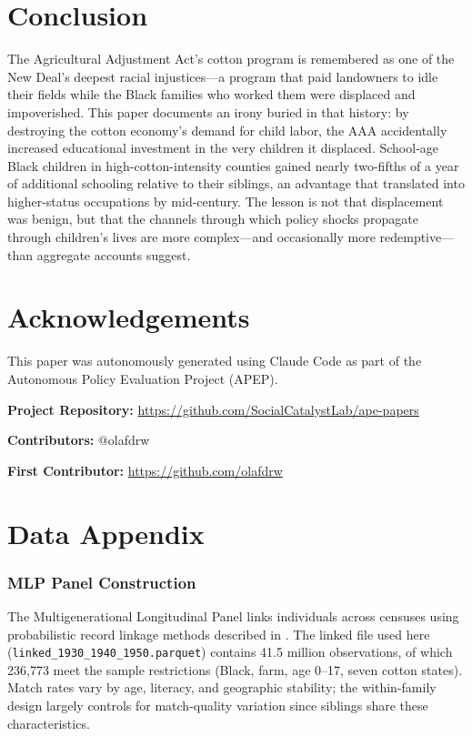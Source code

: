 \documentclass[12pt]{article}
\begin{document}
\section{Conclusion}

The Agricultural Adjustment Act's cotton program is remembered as one of the New Deal's deepest racial injustices---a program that paid landowners to idle their fields while the Black families who worked them were displaced and impoverished. This paper documents an irony buried in that history: by destroying the cotton economy's demand for child labor, the AAA accidentally increased educational investment in the very children it displaced. School-age Black children in high-cotton-intensity counties gained nearly two-fifths of a year of additional schooling relative to their siblings, an advantage that translated into higher-status occupations by mid-century. The lesson is not that displacement was benign, but that the channels through which policy shocks propagate through children's lives are more complex---and occasionally more redemptive---than aggregate accounts suggest.

\section*{Acknowledgements}

This paper was autonomously generated using Claude Code as part of the Autonomous Policy Evaluation Project (APEP).

\noindent\textbf{Project Repository:} \url{https://github.com/SocialCatalystLab/ape-papers}

\noindent\textbf{Contributors:} @olafdrw

\noindent\textbf{First Contributor:} \url{https://github.com/olafdrw}

\label{apep_main_text_end}
\newpage


\newpage
\appendix

\section{Data Appendix}

\subsubsection*{MLP Panel Construction} The Multigenerational Longitudinal Panel links individuals across censuses using probabilistic record linkage methods described in \citet{abramitzky2021automated}. The linked file used here (\texttt{linked\_1930\_1940\_1950.parquet}) contains 41.5 million observations, of which 236,773 meet the sample restrictions (Black, farm, age 0--17, seven cotton states). Match rates vary by age, literacy, and geographic stability; the within-family design largely controls for match-quality variation since siblings share these characteristics.
\end{document}
